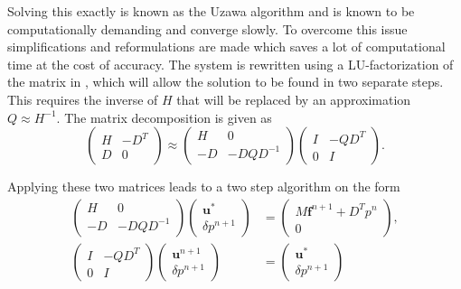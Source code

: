 Solving this exactly is known as the Uzawa algorithm and is known to be 
computationally demanding and converge slowly. To overcome this issue
simplifications and reformulations are made which saves a lot of computational time 
at the cost of accuracy.
The system is rewritten using a LU-factorization of the matrix in , 
which will allow the solution to be found in two separate steps. This 
requires the inverse of $H$ that will be replaced by an approximation $Q\approx H^{-1}$.
The matrix decomposition is given as
%
\begin{equation}
\begin{pmatrix}
    H & -D^T \\ 
    D & 0
\end{pmatrix}
\approx
\begin{pmatrix}
    H & 0 \\ 
    -D & -DQD^{-1}
\end{pmatrix}
\begin{pmatrix}
    I & -QD^T \\ 
    0 & I
\end{pmatrix}.
    \label{eq:LUfactorization}
\end{equation}
%

Applying these two matrices leads to a two step algorithm on the form 
\begin{align}
\begin{pmatrix}
    H & 0 \\ 
    -D & -DQD^{-1}
\end{pmatrix}
\begin{pmatrix}
    \mathbf{u}^{*}  \\ 
    \delta p^{n+1} 
\end{pmatrix}
&=
\begin{pmatrix}
    M\mathbf{f}^{n+1} +D^Tp^n  \\ 
    0 
    \end{pmatrix}
    \label{eq:PCstep1}
    ,\\
\begin{pmatrix}
    I & -QD^T \\ 
    0 & I
\end{pmatrix}
\begin{pmatrix}
    \mathbf{u}^{n+1}  \\ 
    \delta p^{n+1} 
\end{pmatrix}
&=
\begin{pmatrix}
    \mathbf{u}^{*}  \\ 
    \delta p^{n+1} 
\end{pmatrix}
    \label{eq:PCstep2}
\end{align}

